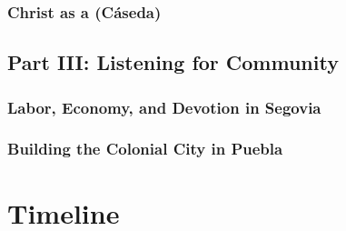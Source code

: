 \documentclass[tt]{vcbook-proposal}
\begin{document}
\subsubsection{Christ as a  (Cáseda)}


\subsection{Part III: Listening for Community}

\subsubsection{Labor, Economy, and Devotion in Segovia}

\subsubsection{Building the Colonial City in Puebla}

\section{Timeline}

\printbibliography
\end{document}
